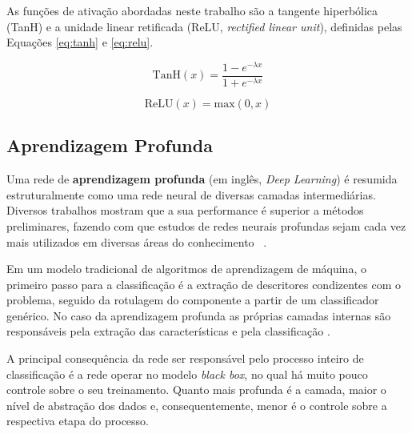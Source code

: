 As funções de ativação abordadas neste trabalho são a tangente hiperbólica (TanH) e a unidade linear retificada (ReLU, \textit{rectified linear unit}), definidas pelas Equações \ref{eq:tanh} e  \ref{eq:relu}. 

\begin{equation}
	\label{eq:tanh}
    \text{TanH}(x) = \frac{1-e^{-\lambda x}}{1+e^{-\lambda x}}
\end{equation}

\begin{equation}
	\label{eq:relu}
    \text{ReLU}(x) = \text{max}(0, x)
\end{equation}



\subsection{Aprendizagem Profunda}
\label{subsec:aprendizagemprofunda}

Uma rede de \textbf{aprendizagem profunda} (em inglês, \textit{Deep Learning}) é resumida estruturalmente como uma rede neural de diversas camadas intermediárias. Diversos trabalhos mostram que a sua performance é superior a métodos preliminares, fazendo com que estudos de redes neurais profundas sejam cada vez mais utilizados em diversas áreas do conhecimento~ \cite{lecun1990handwritten,lecun1998gradient,chen2015standard,lu2016wound,zhong2016field}.

Em um modelo tradicional de algoritmos de aprendizagem de máquina, o primeiro passo para a classificação é a extração de descritores condizentes com o problema, seguido da rotulagem do componente a partir de um classificador genérico. No caso da aprendizagem profunda as próprias camadas internas são responsáveis pela extração das características e pela classificação \cite{lecun1998gradient}.

A principal consequência da rede ser responsável pelo processo inteiro de classificação é a rede operar no modelo \textit{black box}, no qual há muito pouco controle sobre o seu treinamento. Quanto mais profunda é a camada, maior o nível de abstração dos dados e, consequentemente, menor é o controle sobre a respectiva etapa do processo.  

